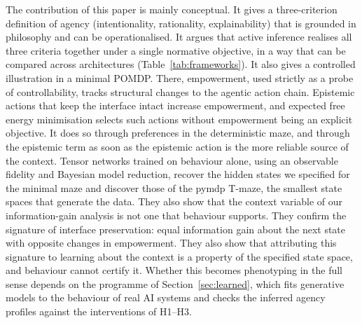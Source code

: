 \documentclass[pdflatex,sn-apa]{sn-jnl}%
\theoremstyle{definition}
\begin{document}
The contribution of this paper is mainly conceptual. It gives a three-criterion definition of agency (intentionality, rationality, explainability) that is grounded in philosophy and can be operationalised. It argues that active inference realises all three criteria together under a single normative objective, in a way that can be compared across architectures (Table~\ref{tab:frameworks}). It also gives a controlled illustration in a minimal POMDP. There, empowerment, used strictly as a probe of controllability, tracks structural changes to the agentic action chain. Epistemic actions that keep the interface intact increase empowerment, and expected free energy minimisation selects such actions without empowerment being an explicit objective. It does so through preferences in the deterministic maze, and through the epistemic term as soon as the epistemic action is the more reliable source of the context. Tensor networks trained on behaviour alone, using an observable fidelity and Bayesian model reduction, recover the hidden states we specified for the minimal maze and discover those of the pymdp T-maze, the smallest state spaces that generate the data. They also show that the context variable of our information-gain analysis is not one that behaviour supports. They confirm the signature of interface preservation: equal information gain about the next state with opposite changes in empowerment. They also show that attributing this signature to learning about the context is a property of the specified state space, and behaviour cannot certify it. Whether this becomes phenotyping in the full sense depends on the programme of Section~\ref{sec:learned}, which fits generative models to the behaviour of real AI systems and checks the inferred agency profiles against the interventions of H1--H3.


\end{document}
